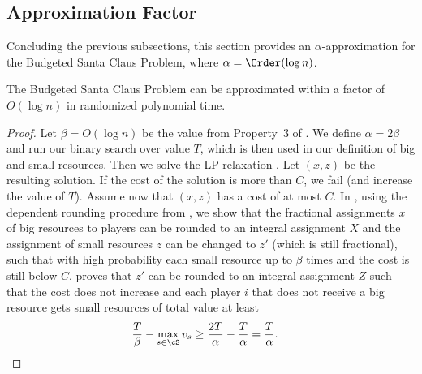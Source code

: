 \subsection{Approximation Factor}
Concluding the previous subsections, this section provides an $\alpha$-approximation for the Budgeted Santa Claus Problem, where $\alpha = \Order(\log n)$. 
\begin{theorem}
    The Budgeted Santa Claus Problem can be approximated within a factor of~$O(\log n)$ in randomized polynomial time.
\end{theorem}
\begin{proof}
   Let $\beta = O(\log n)$ be the value from Property~3 of . We define $\alpha = 2\beta$
   and run our binary search over value $T$,
   which is then used in our definition of big and small resources.
   Then we solve the LP relaxation . 
   Let $(x,z)$ be the resulting solution. 
   If the cost of the solution is more than $C$, we fail (and
   increase the value of $T$). Assume now that $(x,z)$ has
   a cost of at most $C$.
   In , using the dependent rounding procedure from , we show that the fractional assignments $x$ of big resources to players can be rounded to an integral assignment $X$ and the assignment of small resources $z$ can be changed to $z'$ (which is still fractional), such that with high probability each small resource up to
   $\beta$ times and the cost is still below $C$. 
    proves that $z'$
   can be rounded to an integral assignment $Z$ such that
   the cost does not increase and each player $i$ that does
   not receive a big resource gets small resources of total value at least
   \begin{align*}
    \frac{T}{\beta} - \max_{s\in\cS} v_s &\geq \frac{2T}{\alpha} - \frac{T}{\alpha} = \frac{T}{\alpha}. \qedhere
    \end{align*}
\end{proof}
